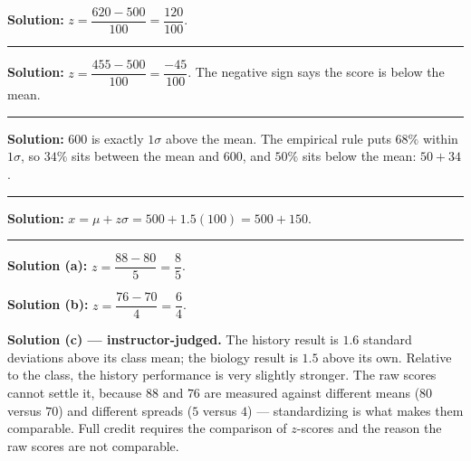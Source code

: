 \documentclass[12pt]{article}
\begin{document}




\textbf{Solution:} \quad $z = \dfrac{620 - 500}{100} = \dfrac{120}{100}$. 

\vspace{0.15cm}\noindent\rule{\linewidth}{0.2pt}\vspace{0.15cm}


\textbf{Solution:} \quad $z = \dfrac{455 - 500}{100} = \dfrac{-45}{100}$. The negative sign says
the score is below the mean. 

\vspace{0.15cm}\noindent\rule{\linewidth}{0.2pt}\vspace{0.15cm}


\textbf{Solution:} \quad $600$ is exactly $1\sigma$ above the mean. The empirical rule puts
$68\%$ within $1\sigma$, so $34\%$ sits between the mean and $600$, and $50\%$ sits below the
mean: $50 + 34$. 

\vspace{0.15cm}\noindent\rule{\linewidth}{0.2pt}\vspace{0.15cm}


\textbf{Solution:} \quad $x = \mu + z\sigma = 500 + 1.5(100) = 500 + 150$. 

\vspace{0.15cm}\noindent\rule{\linewidth}{0.2pt}\vspace{0.15cm}


\textbf{Solution (a):} \quad $z = \dfrac{88 - 80}{5} = \dfrac{8}{5}$. 

\textbf{Solution (b):} \quad $z = \dfrac{76 - 70}{4} = \dfrac{6}{4}$. 

\textbf{Solution (c) --- instructor-judged.} \quad The history result is $1.6$ standard
deviations above its class mean; the biology result is $1.5$ above its own. Relative to the
class, the history performance is very slightly stronger. The raw scores cannot settle it,
because $88$ and $76$ are measured against different means ($80$ versus $70$) and different
spreads ($5$ versus $4$) --- standardizing is what makes them comparable. Full credit requires
the comparison of $z$-scores and the reason the raw scores are not comparable.
\end{document}
